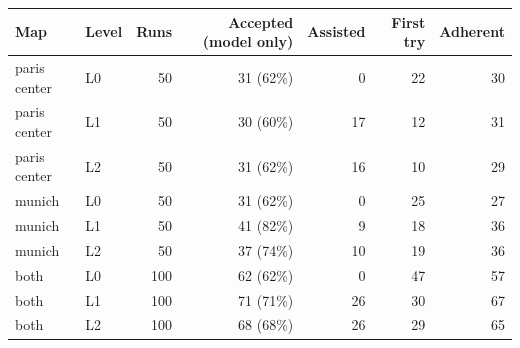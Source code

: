 \begin{tabular}{llrrrrr}
\toprule
Map & Level & Runs & Accepted (model only) & Assisted & First try & Adherent\\
\midrule
paris center & L0 & 50 & 31 (62\%) & 0 & 22 & 30\\
paris center & L1 & 50 & 30 (60\%) & 17 & 12 & 31\\
paris center & L2 & 50 & 31 (62\%) & 16 & 10 & 29\\
\midrule
munich & L0 & 50 & 31 (62\%) & 0 & 25 & 27\\
munich & L1 & 50 & 41 (82\%) & 9 & 18 & 36\\
munich & L2 & 50 & 37 (74\%) & 10 & 19 & 36\\
\bottomrule
both & L0 & 100 & 62 (62\%) & 0 & 47 & 57\\
both & L1 & 100 & 71 (71\%) & 26 & 30 & 67\\
both & L2 & 100 & 68 (68\%) & 26 & 29 & 65\\
\end{tabular}
